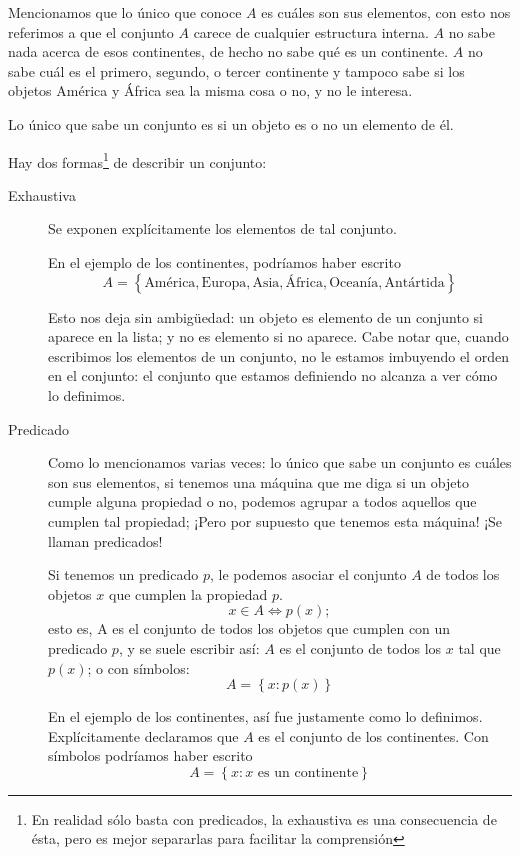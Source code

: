 \documentclass{book}
\newcommand{\set}[1]{\left\lbrace #1 \right\rbrace }
\theoremstyle{definition}
\begin{document}
Mencionamos que lo único que conoce $A$ es cuáles son sus elementos, con esto nos referimos a que el conjunto $A$ carece de cualquier estructura interna. $A$ no sabe nada acerca de esos continentes, de hecho no sabe qué es un continente. $A$ no sabe cuál es el primero, segundo, o tercer continente y tampoco sabe si los objetos América y África sea la misma cosa o no, y no le interesa.

Lo único que sabe un conjunto es si un objeto es o no un elemento de él.

Hay dos formas\footnote{En realidad sólo basta con predicados, la exhaustiva es una consecuencia de ésta, pero es mejor separarlas para facilitar la comprensión} de describir un conjunto:
\begin{description}
	\item[Exhaustiva] Se exponen explícitamente los elementos de tal conjunto.
	
	En el ejemplo de los continentes, podríamos haber escrito \[A = \set{\text{América}, \text{Europa}, \text{Asia}, \text{África}, \text{Oceanía}, \text{Antártida}}\]
	
	Esto nos deja sin ambigüedad: un objeto es elemento de un conjunto si aparece en la lista; y no es elemento si no aparece.
	Cabe notar que, cuando escribimos los elementos de un conjunto, no le estamos imbuyendo el orden en el conjunto: el conjunto que estamos definiendo no alcanza a ver cómo lo definimos.
	
	\item[Predicado] Como lo mencionamos varias veces: lo único que sabe un conjunto es cuáles son sus elementos, si tenemos una máquina que me diga si un objeto cumple alguna propiedad o no, podemos agrupar a todos aquellos que cumplen tal propiedad; ¡Pero por supuesto que tenemos esta máquina! ¡Se llaman predicados!
	
	Si tenemos un predicado $p$, le podemos asociar el conjunto $A$ de todos los objetos $x$ que cumplen la propiedad $p$. 
	\[x\in A \iff p(x);\]
	esto es, A es el conjunto de todos los objetos que cumplen con un predicado $p$, y se suele escribir así: $A$ es el conjunto de todos los $x$ tal que $p(x)$; o con símbolos:
	\[A = \set{x : p(x)}\]
	
	En el ejemplo de los continentes, así fue justamente como lo definimos. Explícitamente declaramos que $A$ es el conjunto de los continentes. Con símbolos podríamos haber escrito
	\[A = \set{x : x\text{ es un continente}}\]
\end{description}
\end{document}
